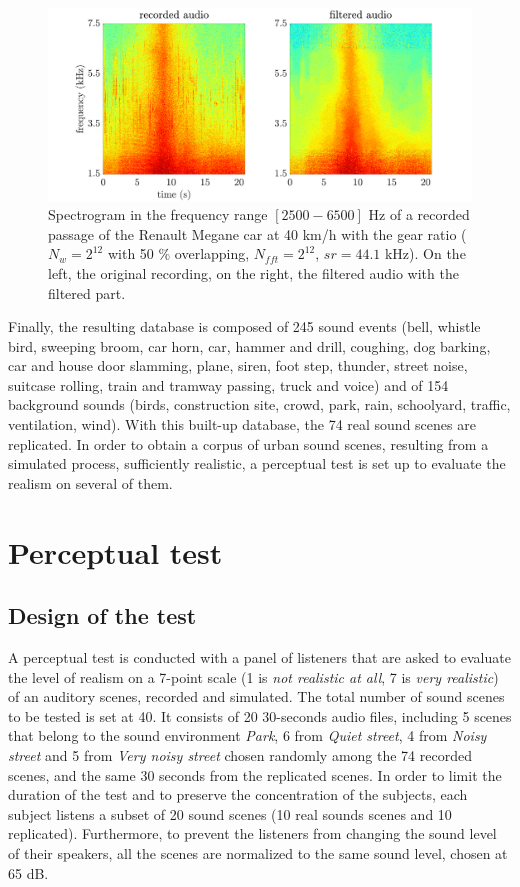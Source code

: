 \documentclass[11pt,letter]{article}
\begin{document}
\begin{figure}[hbtp]
\centering
\includegraphics[width=.7\linewidth]{./pictures/filtrageMedian_VL1_R3_40_EN.pdf}
\caption{Spectrogram in the frequency range $\left[ 2500-6500 \right]$ Hz of a recorded passage of the Renault Megane car at 40 km/h with the  gear ratio ($N_{w} = 2^{12}$ with 50 $\%$ overlapping, $N_{fft} = 2^{12}$, $sr = 44.1$ kHz). On the left, the original recording, on the right, the filtered audio with the filtered part.}
\label{fig:filtre_car}
\end{figure}

Finally, the resulting database is composed of 245 sound events (bell, whistle bird, sweeping broom, car horn, car, hammer and drill, coughing, dog barking, car and house door slamming, plane, siren, foot step, thunder, street noise, suitcase rolling, train and tramway passing, truck and voice) and of 154 background sounds (birds, construction site, crowd, park, rain, schoolyard, traffic, ventilation, wind). With this built-up database, the 74 real sound scenes are replicated. In order to obtain a corpus of urban sound scenes, resulting from a simulated process, sufficiently realistic, a perceptual test is set up to evaluate the realism on several of them.

\section{Perceptual test} \label{sec:test}
\subsection{Design of the test}
A perceptual test is conducted with a panel of listeners that are asked to evaluate the level of realism on a 7-point scale (1 is \textit{not realistic at all}, 7 is \textit{very realistic}) of an auditory scenes, recorded and simulated. The total number of sound scenes to be tested is set at 40. It consists of 20 30-seconds audio files, including 5 scenes that belong to the sound environment \textit{Park}, 6 from \textit{Quiet street}, 4 from \textit{Noisy street} and 5 from \textit{Very noisy street} chosen randomly among the 74 recorded scenes, and the same 30 seconds from the replicated scenes. In order to limit the duration of the test and to preserve the concentration of the subjects, each subject listens a subset of 20 sound scenes (10 real sounds scenes and 10 replicated). Furthermore, to prevent the listeners from changing the sound level of their speakers, all the scenes are normalized to the same sound level, chosen at 65 dB.\\
\end{document}
